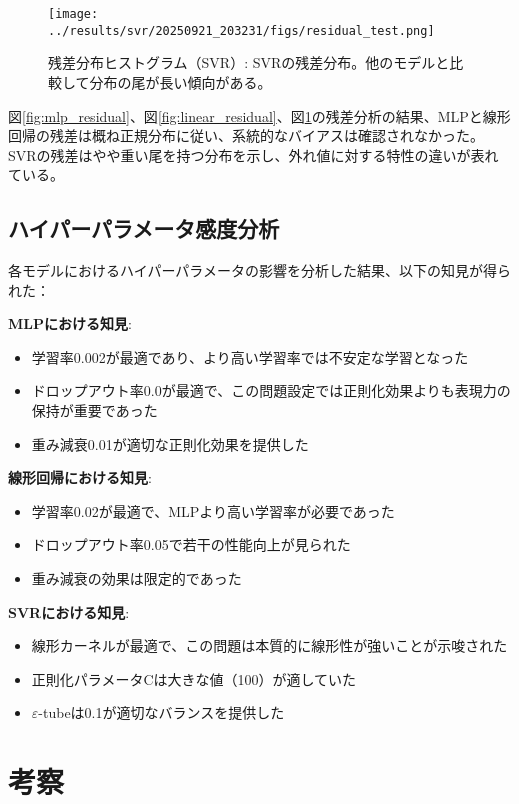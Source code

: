 \documentclass[12pt,a4paper,dvipdfmx]{jsarticle}
\begin{document}
\begin{figure}[H]
\centering
\texttt{[image: ../results/svr/20250921\_203231/figs/residual\_test.png]}
\caption{残差分布ヒストグラム（SVR）: SVRの残差分布。他のモデルと比較して分布の尾が長い傾向がある。}
\label{fig:svr_residual}
\end{figure}

図\ref{fig:mlp_residual}、図\ref{fig:linear_residual}、図\ref{fig:svr_residual}の残差分析の結果、MLPと線形回帰の残差は概ね正規分布に従い、系統的なバイアスは確認されなかった。SVRの残差はやや重い尾を持つ分布を示し、外れ値に対する特性の違いが表れている。

\subsection{ハイパーパラメータ感度分析}

各モデルにおけるハイパーパラメータの影響を分析した結果、以下の知見が得られた：

\textbf{MLPにおける知見}:
\begin{itemize}
    \item 学習率0.002が最適であり、より高い学習率では不安定な学習となった
    \item ドロップアウト率0.0が最適で、この問題設定では正則化効果よりも表現力の保持が重要であった
    \item 重み減衰0.01が適切な正則化効果を提供した
\end{itemize}

\textbf{線形回帰における知見}:
\begin{itemize}
    \item 学習率0.02が最適で、MLPより高い学習率が必要であった
    \item ドロップアウト率0.05で若干の性能向上が見られた
    \item 重み減衰の効果は限定的であった
\end{itemize}

\textbf{SVRにおける知見}:
\begin{itemize}
    \item 線形カーネルが最適で、この問題は本質的に線形性が強いことが示唆された
    \item 正則化パラメータCは大きな値（100）が適していた
    \item $\varepsilon$-tubeは0.1が適切なバランスを提供した
\end{itemize}

\section{考察}
\end{document}
